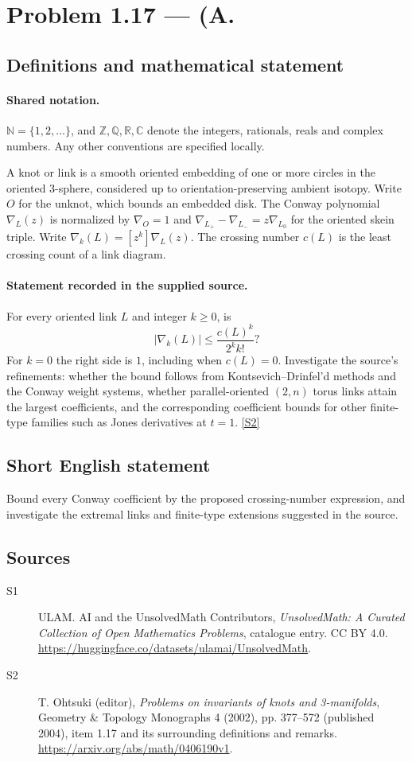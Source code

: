 \documentclass[11pt]{article}
\newcommand{\sref}[2]{\hyperlink{source:#1:#2}{[S#2]}}
\begin{document}
\section{Problem 1.17 — (A.}\label{statement}

\subsection{Definitions and mathematical statement}

\paragraph{Shared notation.}$\mathbb N=\{1,2,\ldots\}$, and $\mathbb Z,\mathbb Q,\mathbb R,\mathbb C$ denote the integers, rationals, reals and complex numbers. Any other conventions are specified locally.


A knot or link is a smooth oriented embedding of one or more circles in the oriented $3$-sphere, considered up to orientation-preserving ambient isotopy. Write $O$ for the unknot, which bounds an embedded disk. The Conway polynomial $\nabla_L(z)$ is normalized by $\nabla_O=1$ and $\nabla_{L_+}-\nabla_{L_-}=z\nabla_{L_0}$ for the oriented skein triple. Write $\nabla_k(L)=[z^k]\nabla_L(z)$. The crossing number $c(L)$ is the least crossing count of a link diagram.
\paragraph{Statement recorded in the supplied source.}
For every oriented link $L$ and integer $k\ge0$, is
\[|\nabla_k(L)|\le \frac{c(L)^k}{2^k k!}?\]
For $k=0$ the right side is $1$, including when $c(L)=0$. Investigate the source's refinements: whether the bound follows from Kontsevich--Drinfel'd methods and the Conway weight systems, whether parallel-oriented $(2,n)$ torus links attain the largest coefficients, and the corresponding coefficient bounds for other finite-type families such as Jones derivatives at $t=1$. \sref{statement}{2}
\subsection{Short English statement}
Bound every Conway coefficient by the proposed crossing-number expression, and investigate the extremal links and finite-type extensions suggested in the source.
\subsection{Sources}
\begin{description}
\item[\hypertarget{source:statement:1}{S1}] ULAM. AI and the UnsolvedMath Contributors, \emph{UnsolvedMath: A Curated Collection of Open Mathematics Problems}, catalogue entry. CC BY 4.0. \url{https://huggingface.co/datasets/ulamai/UnsolvedMath}.
\item[\hypertarget{source:statement:2}{S2}] T. Ohtsuki (editor), \emph{Problems on invariants of knots and 3-manifolds}, Geometry \& Topology Monographs 4 (2002), pp. 377--572 (published 2004), item 1.17 and its surrounding definitions and remarks. \url{https://arxiv.org/abs/math/0406190v1}.
\end{description}
\label{end:statement}
\end{document}
